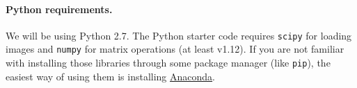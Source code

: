\documentclass[10pt,letterpaper]{article}
\newcommand{\cmd}[1] {{\color{blue}\texttt{#1}}}
\begin{document}
\paragraph{Python requirements.} We will be using Python 2.7. The Python starter code requires \cmd{scipy} for loading images and \cmd{numpy} for matrix operations (at least v1.12).
If you are not familiar with installing those libraries through some package manager (like \cmd{pip}), the easiest way of using them is installing \href{https://conda.io/docs/user-guide/install/index.html}{Anaconda}.
%
%
%
\end{document}

